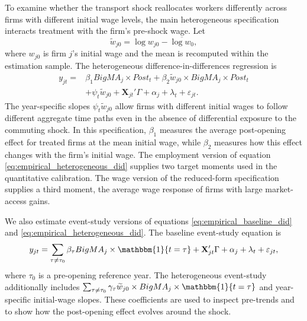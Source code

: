 \documentclass[12pt]{article}
\begin{document}
To examine whether the transport shock reallocates workers differently across firms with different initial wage levels, the main heterogeneous specification interacts treatment with the firm's pre-shock wage. Let
\[
    \widetilde{w}_{j0}
    =
    \log w_{j0}
    -
    \overline{\log w_0},
\]
where \(w_{j0}\) is firm \(j\)'s initial wage and the mean is recomputed within the estimation sample. The heterogeneous difference-in-differences regression is
\begin{equation}
\begin{split}
    y_{jt}
    =
    &\beta_1 BigMA_j\times Post_t
    +
    \beta_2 \widetilde{w}_{j0}\times BigMA_j\times Post_t  \\
    &+
    \psi_t\widetilde{w}_{j0}
    +
    \mathbf{X}_{jt}'\Gamma
    +
    \alpha_j
    +
    \lambda_t
    +
    \varepsilon_{jt}.
\end{split}
    \label{eq:empirical_heterogeneous_did}
\end{equation}
The year-specific slopes \(\psi_t\widetilde{w}_{j0}\) allow firms with different initial wages to follow different aggregate time paths even in the absence of differential exposure to the commuting shock. In this specification, \(\beta_1\) measures the average post-opening effect for treated firms at the mean initial wage, while \(\beta_2\) measures how this effect changes with the firm's initial wage. The employment version of equation \eqref{eq:empirical_heterogeneous_did} supplies two target moments used in the quantitative calibration. The wage version of the reduced-form specification supplies a third moment, the average wage response of firms with large market-access gains.

We also estimate event-study versions of equations \eqref{eq:empirical_baseline_did} and \eqref{eq:empirical_heterogeneous_did}. The baseline event-study equation is
\begin{equation}
    y_{jt}
    =
    \sum_{\tau\neq \tau_0}
    \beta_{\tau} BigMA_j\times \mathbbm{1}\{t=\tau\}
    +
    \mathbf{X}_{jt}'\Gamma
    +
    \alpha_j
    +
    \lambda_t
    +
    \varepsilon_{jt},
    \label{eq:empirical_event_study}
\end{equation}
where \(\tau_0\) is a pre-opening reference year. The heterogeneous event-study additionally includes \(\sum_{\tau\neq \tau_0}\gamma_{\tau}\widetilde{w}_{j0}\times BigMA_j\times \mathbbm{1}\{t=\tau\}\) and year-specific initial-wage slopes. These coefficients are used to inspect pre-trends and to show how the post-opening effect evolves around the shock.
\end{document}
